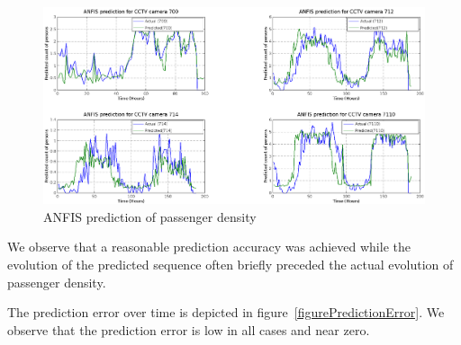 \begin{figure}
\hspace*{-0.6\columnwidth}%
\parbox{1.6\columnwidth}{
  \centering
     \includegraphics[width=1.6\columnwidth]{Figures/Figure_Prediction.png}
 \caption{ANFIS prediction of passenger density}
 \label{FigurePrediction}
 }
\end{figure}

We observe that a reasonable prediction accuracy was achieved while the evolution of the predicted sequence often briefly preceded the actual evolution of passenger density.

The prediction error over time is depicted in figure~\ref{figurePredictionError}.
We observe that the prediction error is low in all cases and near zero.





